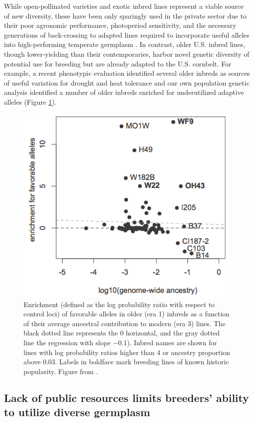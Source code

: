 \documentclass[12pt]{article}
\begin{document}
While open-pollinated varieties and exotic inbred lines represent a viable source of new diversity, these have been only sparingly used in the private sector due to their poor agronomic performance, photoperiod sensitivity, and the necessary generations of back-crossing to adapted lines required to incorporate useful alleles into high-performing temperate germplasm \citep{goodman1999broadening}.
In contrast, older U.S. inbred lines, though lower-yielding than their contemporaries, harbor novel genetic diversity of potential use for breeding but are already adapted to the U.S. cornbelt.  
For example, a recent phenotypic evaluation identified several older inbreds as sources of useful variation for drought and heat tolerance \citep{chen2012characterization} and our own population genetic analysis identified a number of older inbreds enriched for underutilized adaptive alleles (Figure \ref{wf9}).

\begin{figure}
\includegraphics[width=0.5\linewidth]{joost_wf9.png}
\caption{Enrichment (defined as the log probability ratio with respect to control loci) of favorable alleles in older (era 1) inbreds as a function of their average ancestral contribution to modern (era 3) lines. The black dotted line represents the 0 horizontal, and the gray dotted line the regression  with slope −0.1). Inbred names are shown for lines with log probability ratios higher than 4 or ancestry proportion above 0.03. Labels in boldface mark breeding lines of known historic popularity. Figure from \citet{van2012historical}.} 
\label{wf9}
\end{figure}

\subsection{Lack of public resources limits breeders' ability to utilize diverse germplasm}
\end{document}
